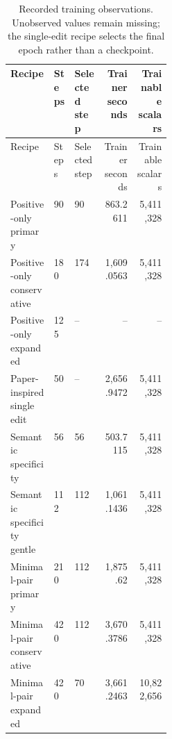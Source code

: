\begingroup\small
\begin{longtable}{p{0.27\linewidth}llrr}
\caption{Recorded training observations. Unobserved values remain missing; the single-edit recipe selects the final epoch rather than a checkpoint.}\label{tab:generated-training}\\
\toprule
Recipe & Steps & Selected step & Trainer seconds & Trainable scalars \\
\midrule\endfirsthead
\toprule
Recipe & Steps & Selected step & Trainer seconds & Trainable scalars \\
\midrule\endhead
Positive-only primary & 90 & 90 & 863.2611 & 5,411,328 \\
Positive-only conservative & 180 & 174 & 1,609.0563 & 5,411,328 \\
Positive-only expanded & 125 & -- & -- & -- \\
Paper-inspired single edit & 50 & -- & 2,656.9472 & 5,411,328 \\
Semantic specificity & 56 & 56 & 503.7115 & 5,411,328 \\
Semantic specificity gentle & 112 & 112 & 1,061.1436 & 5,411,328 \\
Minimal-pair primary & 210 & 112 & 1,875.62 & 5,411,328 \\
Minimal-pair conservative & 420 & 112 & 3,670.3786 & 5,411,328 \\
Minimal-pair expanded & 420 & 70 & 3,661.2463 & 10,822,656 \\
\bottomrule\end{longtable}\endgroup

